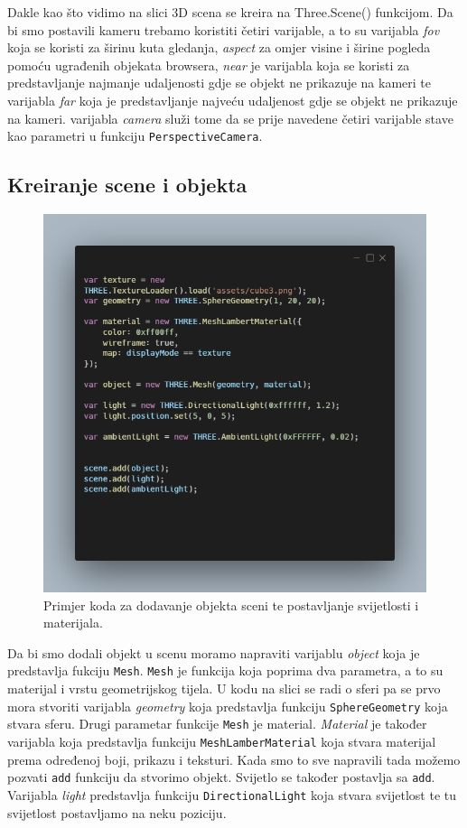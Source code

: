 \documentclass[a4paper,12pt]{article}
\begin{document}
Dakle kao što vidimo na slici 3D scena se kreira na Three.Scene() funkcijom. Da bi smo postavili kameru trebamo koristiti četiri varijable, a to su 
varijabla \textit{fov} koja se koristi za širinu kuta gledanja, \textit{aspect} za omjer visine i širine pogleda pomoću ugrađenih objekata browsera, \textit{near} je 
varijabla koja se koristi za predstavljanje najmanje udaljenosti gdje se objekt ne prikazuje na kameri te varijabla \textit{far} koja je predstavljanje najveću 
udaljenost gdje se objekt ne prikazuje na kameri.
varijabla \textit{camera} služi tome da se prije navedene četiri varijable stave kao parametri u funkciju \texttt{PerspectiveCamera}.
\subsection{Kreiranje scene i objekta}
\begin{figure}[ht]
    \centering
    \includegraphics[scale=0.5]{image/zadatak1_objekti.png}
    \caption{Primjer koda za dodavanje objekta sceni te postavljanje svijetlosti i materijala.}
\end{figure}


Da bi smo dodali objekt u scenu moramo napraviti varijablu \textit{object} koja je predstavlja fukciju \texttt{Mesh}. \texttt{Mesh} je funkcija koja poprima dva parametra, a to su materijal i 
vrstu geometrijskog tijela. U kodu na slici se radi o sferi pa se prvo mora stvoriti varijabla \textit{geometry} koja predstavlja funkciju \texttt{SphereGeometry} koja stvara sferu.
Drugi parametar funkcije \texttt{Mesh} je material. \textit{Material} je također varijabla koja predstavlja funkciju \texttt{MeshLamberMaterial} koja stvara materijal prema određenoj boji, 
prikazu i teksturi. Kada smo to sve napravili tada možemo pozvati \texttt{add} funkciju da stvorimo objekt. Svijetlo  se također postavlja sa \texttt{add}.
Varijabla \textit{light} predstavlja funkciju \texttt{DirectionalLight} koja stvara svijetlost te tu svijetlost postavljamo na neku poziciju. 
\pagebreak
\end{document}
